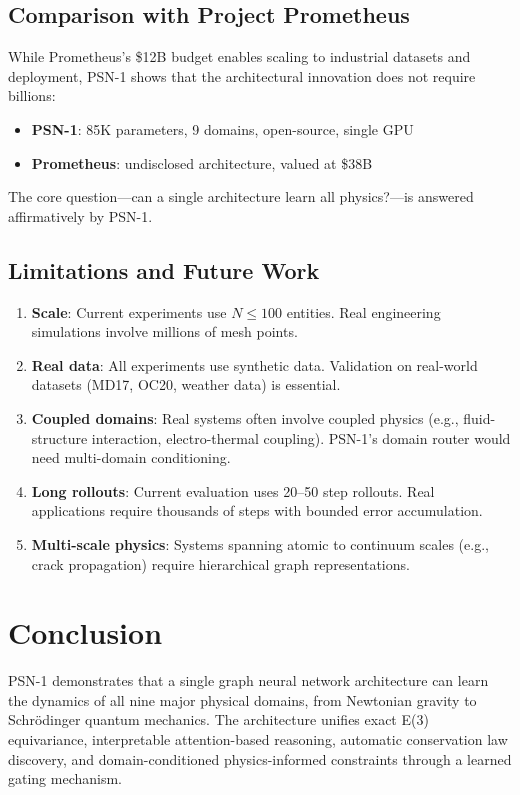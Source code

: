 \documentclass[11pt,a4paper]{article}
\begin{document}
\subsection{Comparison with Project Prometheus}

While Prometheus's \$12B budget enables scaling to industrial datasets and deployment, PSN-1 shows that the architectural innovation does not require billions:
\begin{itemize}[leftmargin=*]
    \item \textbf{PSN-1}: 85K parameters, 9 domains, open-source, single GPU
    \item \textbf{Prometheus}: undisclosed architecture, valued at \$38B
\end{itemize}

The core question---can a single architecture learn all physics?---is answered affirmatively by PSN-1.

\subsection{Limitations and Future Work}

\begin{enumerate}[leftmargin=*]
    \item \textbf{Scale}: Current experiments use $N \leq 100$ entities. Real engineering simulations involve millions of mesh points.
    \item \textbf{Real data}: All experiments use synthetic data. Validation on real-world datasets (MD17, OC20, weather data) is essential.
    \item \textbf{Coupled domains}: Real systems often involve coupled physics (e.g., fluid-structure interaction, electro-thermal coupling). PSN-1's domain router would need multi-domain conditioning.
    \item \textbf{Long rollouts}: Current evaluation uses 20--50 step rollouts. Real applications require thousands of steps with bounded error accumulation.
    \item \textbf{Multi-scale physics}: Systems spanning atomic to continuum scales (e.g., crack propagation) require hierarchical graph representations.
\end{enumerate}

\section{Conclusion}

PSN-1 demonstrates that a single graph neural network architecture can learn the dynamics of all nine major physical domains, from Newtonian gravity to Schr\"{o}dinger quantum mechanics. The architecture unifies exact E(3) equivariance, interpretable attention-based reasoning, automatic conservation law discovery, and domain-conditioned physics-informed constraints through a learned gating mechanism. 
\end{document}
